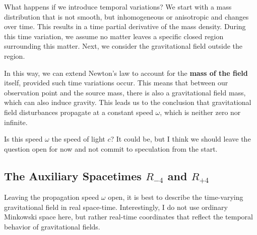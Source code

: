 \documentclass[11pt,a4paper,oneside]{article}
\begin{document}
What happens if we introduce temporal variations? We start with a mass distribution that is not smooth, but inhomogeneous or anisotropic and changes over time. This results in a time partial derivative of the mass density. During this time variation, we assume no matter leaves a specific closed region surrounding this matter. Next, we consider the gravitational field outside the region.

\begin{center}
\end{center}

In this way, we can extend Newton's law to account for the \textbf{mass of the field} itself, provided such time variations occur. This means that between our observation point and the source mass, there is also a gravitational field mass, which can also induce gravity. This leads us to the conclusion that gravitational field disturbances propagate at a constant speed $\omega$, which is neither zero nor infinite.

Is this speed $\omega$ the speed of light $c$? It could be, but I think we should leave the question open for now and not commit to speculation from the start.

\subsection{The Auxiliary Spacetimes \texorpdfstring{$R_{-4}$}{R-4} and \texorpdfstring{$R_{+4}$}{R+4}}

Leaving the propagation speed $\omega$ open, it is best to describe the time-varying gravitational field in real space-time. Interestingly, I do not use ordinary Minkowski space here, but rather real-time coordinates that reflect the temporal behavior of gravitational fields.
\end{document}
